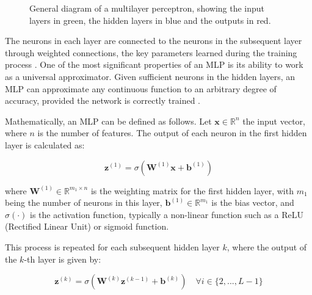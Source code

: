 \begin{figure}
    \centering
    \setlength{}        
    \setlength{}
    \resizebox{\figurewidth}{\figureheight}{}
    \caption{General diagram of a multilayer perceptron, showing the input layers in green, the hidden layers in blue and the outputs in red.}\label{fig:FCNN_representation}
\end{figure}



The neurons in each layer are connected to the neurons in the subsequent layer through weighted connections, the key parameters learned during the training process \cite{Hippert_Pedreira_Souza_2001}. One of the most significant properties of an MLP is its ability to work as a universal approximator. Given sufficient neurons in the hidden layers, an MLP can approximate any continuous function to an arbitrary degree of accuracy, provided the network is correctly trained \cite{Zhang_Eddy_Patuwo_Y_Hu_1998}.

Mathematically, an MLP can be defined as follows. Let $\mathbf{x} \in \mathbb{R}^n$ the input vector, where $n$ is the number of features. The output of each neuron in the first hidden layer is calculated as:

\begin{equation}
 \mathbf{z}^{(1)} = \sigma\left(\mathbf{W}^{(1)}\mathbf{x} + \mathbf{b}^{(1)}\right)   
    \label{eq:output_neuron}
\end{equation}



\noindent where $\mathbf{W}^{(1)} \in \mathbb{R}^{m_1 \times n}$ is the weighting matrix for the first hidden layer, with $m_1$ being the number of neurons in this layer, $\mathbf{b}^{(1)} \in \mathbb{R}^{m_1}$ is the bias vector, and $\sigma(\cdot)$ is the activation function, typically a non-linear function such as a ReLU (Rectified Linear Unit) or sigmoid function.

This process is repeated for each subsequent hidden layer $k$, where the output of the $k$-th layer is given by:

\begin{equation}
 \mathbf{z}^{(k)} = \sigma\left(\mathbf{W}^{(k)}\mathbf{z}^{(k-1)} + \mathbf{b}^{(k)}\right) \quad \forall i \in \{ 2, ..., L-1 \} 
    \label{eq:hidden_layers_output}
\end{equation}


